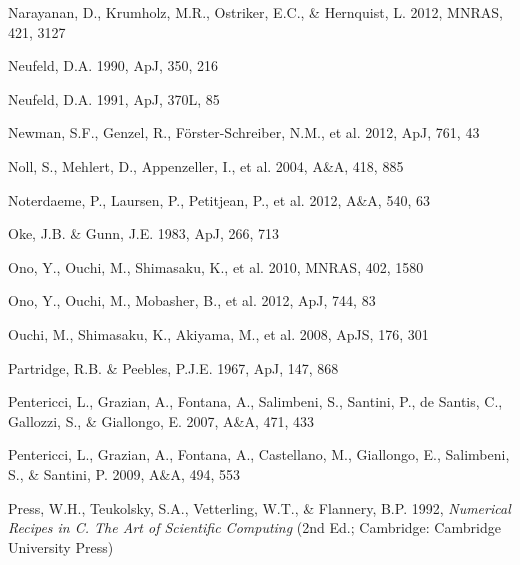 \documentclass{emulateapj}
\def\apj{ApJ}
\def\apjs{ApJS}
\def\mnras{MNRAS}
\def\aap{A\&A}
\begin{document}
\begin{thebibliography}{}
 Narayanan, D., Krumholz, M.R., Ostriker, E.C., \& Hernquist, L. 2012, \mnras, 421, 3127

 Neufeld, D.A. 1990, \apj, 350, 216

 Neufeld, D.A. 1991, \apj, 370L, 85 

 Newman, S.F., Genzel, R., F\"{o}rster-Schreiber, N.M., et al. 2012, \apj, 761, 43

 Noll, S., Mehlert, D., Appenzeller, I., et al. 2004, \aap, 418, 885

 Noterdaeme, P., Laursen, P., Petitjean, P., et al. 2012, \aap, 540, 63

 Oke, J.B. \& Gunn, J.E. 1983, \apj, 266, 713

 Ono, Y., Ouchi, M., Shimasaku, K., et al. 2010, \mnras, 402, 1580

 Ono, Y., Ouchi, M., Mobasher, B., et al. 2012, \apj, 744, 83

 Ouchi, M., Shimasaku, K., Akiyama, M., et al. 2008, \apjs, 176, 301 

 Partridge, R.B. \& Peebles, P.J.E. 1967, \apj, 147, 868

 Pentericci, L., Grazian, A., Fontana, A., Salimbeni, S., Santini, P., de Santis, C., Gallozzi, S., \& Giallongo, E. 2007, \aap, 471, 433

 Pentericci, L., Grazian, A., Fontana, A., Castellano, M., Giallongo, E., Salimbeni, S., \& Santini, P. 2009, \aap, 494, 553

 Press, W.H., Teukolsky, S.A., Vetterling, W.T., \& Flannery, B.P. 1992, \textit{Numerical Recipes in C. The Art of Scientific Computing} (2nd Ed.; Cambridge: Cambridge University Press)


\end{thebibliography}
\end{document}

